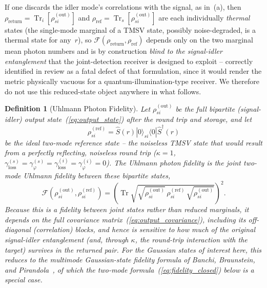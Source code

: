 \documentclass[journal]{IEEEtran}
\newtheorem{definition}{Definition}
\DeclareMathOperator{\Tr}{Tr}
\begin{document}
If one discards the idler mode's correlations with the signal, as in~(a), then $\rho_{\text{return}}=\Tr_i[\rho_{si}^{(\text{out})}]$ and $\rho_{\text{ref}}=\Tr_s[\rho_{si}^{(\text{out})}]$ are each individually \emph{thermal} states (the single-mode marginal of a TMSV state, possibly noise-degraded, is a thermal state for any~$r$), so $\mathcal F(\rho_{\text{return}},\rho_{\text{ref}})$ depends only on the two marginal mean photon numbers and is by construction \emph{blind to the signal-idler entanglement} that the joint-detection receiver is designed to exploit -- correctly identified in review as a fatal defect of that formulation, since it would render the metric physically vacuous for a quantum-illumination-type receiver. We therefore do not use this reduced-state object anywhere in what follows.

\begin{definition}[Uhlmann Photon Fidelity]\label{def:uhlmann}
Let $\rho_{si}^{(\text{out})}$ be the full bipartite (signal-idler) output state~(\ref{eq:output_state}) after the round trip and storage, and let
\begin{equation}
\rho_{si}^{(\text{ref})} = \hat{S}(r)|0\rangle_{si}\langle 0|\hat{S}^\dagger(r)
\end{equation}
be the \emph{ideal} two-mode reference state -- the noiseless TMSV state that would result from a perfectly reflecting, noiseless round trip ($\kappa=1$, $\gamma_{\text{loss}}^{(s)}=\gamma_\varphi^{(s)}=\gamma_{\text{loss}}^{(i)}=\gamma_\varphi^{(i)}=0$). The \emph{Uhlmann photon fidelity} is the joint two-mode Uhlmann fidelity between these bipartite states,
\begin{equation}\label{eq:uhlmann_fidelity}
\mathcal{F}\!\left(\rho_{si}^{(\text{out})}, \rho_{si}^{(\text{ref})}\right) = \left(\Tr\sqrt{\sqrt{\rho_{si}^{(\text{out})}}\,\rho_{si}^{(\text{ref})}\,\sqrt{\rho_{si}^{(\text{out})}}}\right)^2.
\end{equation}
Because this is a fidelity between \emph{joint} states rather than reduced marginals, it depends on the full covariance matrix~(\ref{eq:output_covariance}), including its off-diagonal (correlation) blocks, and hence is sensitive to how much of the original signal-idler entanglement (and, through $\kappa$, the round-trip interaction with the target) survives in the returned pair. For the Gaussian states of interest here, this reduces to the multimode Gaussian-state fidelity formula of Banchi, Braunstein, and Pirandola~\cite{banchi2015quantum}, of which the two-mode formula~(\ref{eq:fidelity_closed}) below is a special case.
\end{definition}
\end{document}
